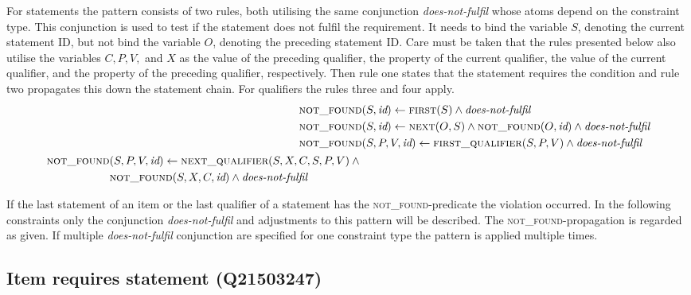 \documentclass[hyperref,bachelorofscience,fleqn]{cgvpub}
\begin{document}
For statements the pattern consists of two rules, both utilising the same conjunction \emph{does-not-fulfil} whose atoms depend on the constraint type. This conjunction is used to test if the statement does not fulfil the requirement. It needs to bind the variable \(S\), denoting the current statement ID, but not bind the variable \(O\), denoting the preceding statement ID. Care must be taken that the rules presented below also utilise the variables \(C, P, V,\) and \(X\) as the value of the preceding qualifier, the property of the current qualifier, the value of the current qualifier, and the property of the preceding qualifier, respectively. Then rule one states that the statement requires the condition and rule two propagates this down the statement chain. For qualifiers the rules three and four apply.
\begin{align}
\textsc{not\_found}&(S, \emph{id}) \leftarrow \textsc{first}(S) \wedge \emph{does-not-fulfil} \\
\textsc{not\_found}&(S, \emph{id}) \leftarrow \textsc{next}(O, S) \wedge \textsc{not\_found}(O, \emph{id}) \wedge \emph{does-not-fulfil} \\
\textsc{not\_found}&(S, P, V, \emph{id}) \leftarrow \textsc{first\_qualifier}(S, P, V) \wedge \emph{does-not-fulfil} \\
\begin{split}
\textsc{not\_found}&(S, P, V, \emph{id}) \leftarrow \textsc{next\_qualifier}(S, X, C, S, P, V) \wedge{} \\
&\textsc{not\_found}(S, X, C, \emph{id}) \wedge \emph{does-not-fulfil}
\end{split}
\end{align}

If the last statement of an item or the last qualifier of a statement has the \textsc{not\_found}-predicate the violation occurred. In the following constraints only the conjunction \emph{does-not-fulfil} and adjustments to this pattern will be described. The \textsc{not\_found}-propagation is regarded as given. If multiple \emph{does-not-fulfil} conjunction are specified for one constraint type the pattern is applied multiple times.

\subsection{Item requires statement (Q21503247)}\label{subsec_item_requires_statement}
\end{document}
